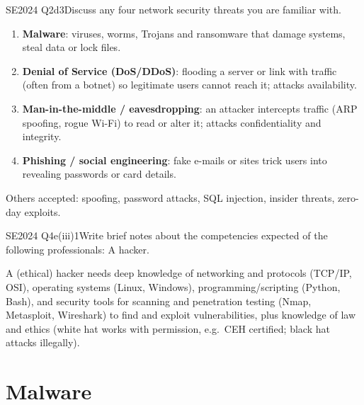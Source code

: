\documentclass[10pt]{article}
\begin{document}
\begin{pastq}{SE2024 Q2d}{3}Discuss any four network security threats you are familiar with.\end{pastq}
\begin{ans}
\begin{enumerate}
\item \textbf{Malware}: viruses, worms, Trojans and ransomware that damage systems, steal data or lock files.
\item \textbf{Denial of Service (DoS/DDoS)}: flooding a server or link with traffic (often from a botnet) so legitimate users cannot reach it; attacks availability.
\item \textbf{Man-in-the-middle / eavesdropping}: an attacker intercepts traffic (ARP spoofing, rogue Wi-Fi) to read or alter it; attacks confidentiality and integrity.
\item \textbf{Phishing / social engineering}: fake e-mails or sites trick users into revealing passwords or card details.
\end{enumerate}
Others accepted: spoofing, password attacks, SQL injection, insider threats, zero-day exploits.
\end{ans}

\begin{pastq}{SE2024 Q4e(iii)}{1}Write brief notes about the competencies expected of the following professionals: A hacker.\end{pastq}
\begin{ans}
A (ethical) hacker needs deep knowledge of networking and protocols (TCP/IP, OSI), operating systems (Linux, Windows), programming/scripting (Python, Bash), and security tools for scanning and penetration testing (Nmap, Metasploit, Wireshark) to find and exploit vulnerabilities, plus knowledge of law and ethics (white hat works with permission, e.g.\ CEH certified; black hat attacks illegally).
\end{ans}

\section{Malware}
\end{document}
